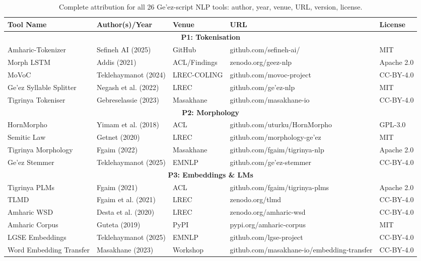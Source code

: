 \documentclass[12pt,a4paper]{article}
\theoremstyle{plain}
\theoremstyle{definition}
\begin{document}
\begin{table}[ht]
\centering
\caption{Complete attribution for all 26 Ge'ez-script NLP tools: author, year, venue, URL, version, license.}
\label{table:attribution}
\footnotesize
\begin{tabularx}{\textwidth}{|l|l|l|l|l|}
\hline
\textbf{Tool Name} & \textbf{Author(s)/Year} & \textbf{Venue} & \textbf{URL} & \textbf{License} \\
\hline
\multicolumn{5}{|c|}{\textbf{P1: Tokenisation}} \\
\hline
Amharic-Tokenizer & Sefineh AI (2025) & GitHub & github.com/sefineh-ai/ & MIT \\
Morph LSTM & Addis (2021) & ACL/Findings & zenodo.org/geez-nlp & Apache 2.0 \\
MoVoC & Teklehaymanot (2024) & LREC-COLING & github.com/movoc-project & CC-BY-4.0 \\
Ge'ez Syllable Splitter & Negash et al. (2022) & LREC & github.com/ge'ez-nlp & MIT \\
Tigrinya Tokeniser & Gebreselassie (2023) & Masakhane & github.com/masakhane-io & CC-BY-4.0 \\
\hline
\multicolumn{5}{|c|}{\textbf{P2: Morphology}} \\
\hline
HornMorpho & Yimam et al. (2018) & ACL & github.com/uturku/HornMorpho & GPL-3.0 \\
Semitic Law & Getnet (2020) & LREC & github.com/morphology-ge'ez & MIT \\
Tigrinya Morphology & Fgaim (2022) & Masakhane & github.com/fgaim/tigrinya-nlp & Apache 2.0 \\
Ge'ez Stemmer & Teklehaymanot (2025) & EMNLP & github.com/ge'ez-stemmer & CC-BY-4.0 \\
\hline
\multicolumn{5}{|c|}{\textbf{P3: Embeddings \& LMs}} \\
\hline
Tigrinya PLMs & Fgaim (2021) & ACL & github.com/fgaim/tigrinya-plms & Apache 2.0 \\
TLMD & Fgaim et al. (2021) & LREC & zenodo.org/tlmd & CC-BY-4.0 \\
Amharic WSD & Desta et al. (2020) & LREC & zenodo.org/amharic-wsd & CC-BY-4.0 \\
Amharic Corpus & Guteta (2019) & PyPI & pypi.org/amharic-corpus & MIT \\
LGSE Embeddings & Teklehaymanot (2025) & EMNLP & github.com/lgse-project & CC-BY-4.0 \\
Word Embedding Transfer & Masakhane (2023) & Workshop & github.com/masakhane-io/embedding-transfer & CC-BY-4.0 \\

\end{tabularx}
\end{table}
\end{document}

